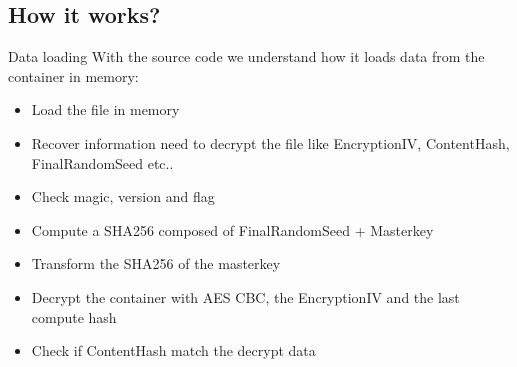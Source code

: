 \documentclass[compress]{beamer}
\begin{document}
\subsection{How it works?}
\begin{frame}{Data loading}
  With the source code we understand how it loads data from the container in memory:
  \begin{itemize}
    \item Load the file in memory
    \item Recover information need to decrypt the file like EncryptionIV, ContentHash, FinalRandomSeed etc..
    \item Check magic, version and flag
    \item Compute a SHA256 composed of FinalRandomSeed + Masterkey
    \item Transform the SHA256 of the masterkey
    \item Decrypt the container with AES CBC, the EncryptionIV and the last compute hash
    \item Check if ContentHash match the decrypt data
  \end{itemize}
\end{frame}
\end{document}
